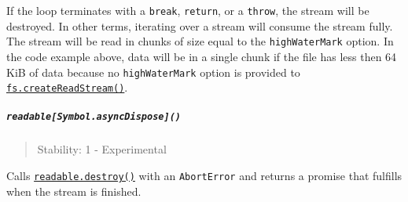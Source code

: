\begin{Shaded}
\begin{Highlighting}[]
\OperatorTok{=} \NormalTok{(}\NormalTok{)}\OperatorTok{;}

  
\NormalTok{(}\NormalTok{)}\OperatorTok{;}
  \OperatorTok{=} \StringTok{\textquotesingle{}\textquotesingle{}}\OperatorTok{;}
   \NormalTok{ (}
\OperatorTok{+=}\OperatorTok{;}
\NormalTok{  \}}
  \OperatorTok{;}
\NormalTok{\}}

\NormalTok{(}\NormalTok{))}\NormalTok{(}\NormalTok{)}\OperatorTok{;}
\end{Highlighting}
\end{Shaded}

If the loop terminates with a \texttt{break}, \texttt{return}, or a
\texttt{throw}, the stream will be destroyed. In other terms, iterating
over a stream will consume the stream fully. The stream will be read in
chunks of size equal to the \texttt{highWaterMark} option. In the code
example above, data will be in a single chunk if the file has less then
64 KiB of data because no \texttt{highWaterMark} option is provided to
\href{fs.md\#fscreatereadstreampath-options}{\texttt{fs.createReadStream()}}.

\subparagraph{\texorpdfstring{\texttt{readable{[}Symbol.asyncDispose{]}()}}{readable{[}Symbol.asyncDispose{]}()}}\label{readablesymbol.asyncdispose}

\begin{quote}
Stability: 1 - Experimental
\end{quote}

Calls \hyperref[readabledestroyerror]{\texttt{readable.destroy()}} with
an \texttt{AbortError} and returns a promise that fulfills when the
stream is finished.

